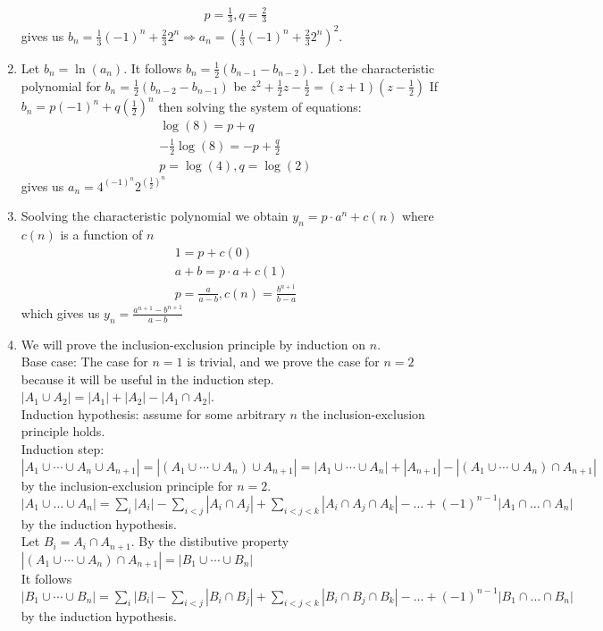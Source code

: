 \documentclass[10pt]{article}
\begin{document}
\begin{enumerate}[label= (Q-\arabic*)]
\begin{align*}
        p=\frac{1}{3},q=\frac{2}{3}
    \end{align*}
    gives us $b_n=\frac{1}{3}{(-1)}^n+\frac{2}{3}2^n\Rightarrow a_n={(\frac{1}{3}{(-1)}^n+\frac{2}{3}2^n)}^2$.
    \item Let $b_n=\ln(a_n)$. It follows $b_n=\frac{1}{2}(b_{n-1}-b_{n-2})$. 
    Let the characteristic polynomial for $b_n=\frac{1}{2}(b_{n-2}-b_{n-1})$ be $z^2+\frac{1}{2}z-\frac{1}{2}=(z+1)(z-\frac{1}{2})$
    If $b_n=p{(-1)}^n+q{(\frac{1}{2})}^n$ then solving the system of equations:
    \begin{align*}
       \log(8)=p+q\\
       -\frac{1}{2}\log(8)=-p+\frac{q}{2}\\
       p=\log(4),q=\log(2)
    \end{align*}
    gives us $a_n=4^{{(-1)}^n}2^{{(\frac{1}{2})}^n}$
    \item Soolving the characteristic polynomial we obtain $y_n=p\cdot a^n+c(n)$ where $c(n)$ is a function of $n$
    \begin{align*}
        1=p+c(0)\\
        a+b=p\cdot a+c(1)\\
        p=\frac{a}{a-b}, c(n)=\frac{b^{n+1}}{b-a}
    \end{align*}
    which gives us $y_n=\frac{a^{n+1}-b^{n+1}}{a-b}$
    \item We will prove the inclusion-exclusion principle by induction on $n$.\\
    Base case: The case for $n=1$ is trivial, and we prove the case for $n=2$ because it will be useful in the induction step. $\displaystyle |A_1\cup A_2|=|A_1|+|A_2|-|A_1\cap A_2|$.\\
    Induction hypothesis: assume for some arbitrary $n$ the inclusion-exclusion principle holds.\\
    Induction step: $\displaystyle |A_1\cup\cdots\cup A_n\cup A_{n+1}|=|(A_1\cup\cdots\cup A_n)\cup A_{n+1}|=|A_1\cup\cdots\cup A_n|+|A_{n+1}|-|(A_1\cup\cdots\cup A_n)\cap A_{n+1}|$ by the inclusion-exclusion principle for $n=2$.\\
    $\displaystyle |A_1\cup\ldots\cup A_n|=\sum_{i}|A_i|-\sum_{i<j}|A_i\cap A_j|+\sum_{i<j<k}|A_i\cap A_j\cap A_k|-\ldots+{(-1)}^{n-1}|A_1\cap\ldots\cap A_n|$ by the induction hypothesis.\\
    Let $B_i=A_i\cap A_{n+1}$. By the distibutive property $|(A_1\cup\cdots\cup A_n)\cap A_{n+1}|=|B_1\cup\cdots\cup B_n|$\\
    It follows $\displaystyle|B_1\cup\cdots\cup B_n|=\sum_{i}|B_i|-\sum_{i<j}|B_i\cap B_j|+\sum_{i<j<k}|B_i\cap B_j\cap B_k|-\ldots+{(-1)}^{n-1}|B_1\cap\ldots\cap B_n|$ by the induction hypothesis.\\

\end{enumerate}
\end{document}
